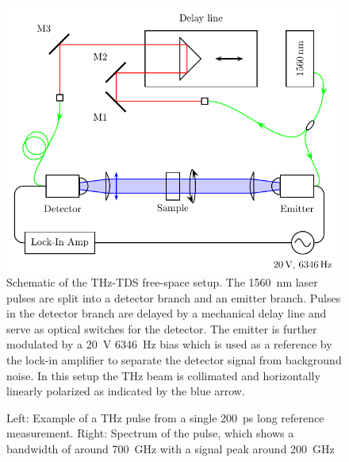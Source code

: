 \begin{figure}[H]
    \centering
    \includegraphics{images/3_chapter03/Setup-THz-TDS-Lab1.pdf}
    \caption{Schematic of the THz-TDS free-space setup. The \SI{1560}{\nano \meter} laser pulses are split into a detector branch and an emitter branch. Pulses in the detector branch are delayed by a mechanical delay line and serve as optical switches for the detector. The emitter is further modulated by a \SI{20}{\volt} \SI{6346}{\hertz} bias which is used as a reference by the lock-in amplifier to separate the detector signal from background noise. In this setup the THz beam is collimated and horizontally linearly polarized as indicated by the blue arrow.}
    \label{fig:THz_bowtie_setup}
\end{figure}

\begin{figure}[H]
    \centering
    
    \caption{Left: Example of a THz pulse from a single \SI{200}{\pico \second} long reference measurement. Right: Spectrum of the pulse, which shows a bandwidth of around \SI{700}{\giga \hertz} with a signal peak around \SI{200}{\giga \hertz}}
    \label{fig:BT_pulse_example}
\end{figure}

